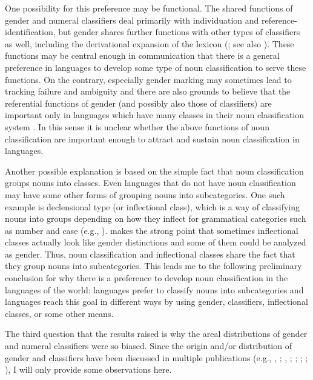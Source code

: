 \documentclass[output=collectionpaper]{langsci/langscibook}
\begin{document}
One possibility for this preference may be functional. The shared functions of gender and numeral classifiers deal primarily with individuation and reference-identification, but gender shares further functions with other types of classifiers as well, including the derivational expansion of the lexicon (\citealt{Contini-Morava2013}; see also \citealt[136--141]{Riddle2008}). These functions may be central enough in communication that there is a general preference in languages to develop some type of noun classification to serve these functions. On the contrary, especially gender marking may sometimes lead to tracking failure and ambiguity and there are also grounds to believe that the referential functions of gender (and possibly also those of classifiers) are important only in languages which have many classes in their noun classification system \citep[158--159]{Trudgill2011}. In this sense it is unclear whether the above functions of noun classification are important enough to attract and sustain noun classification in languages.

Another possible explanation is based on the simple fact that noun classification groups nouns into classes. Even languages that do not have noun classification may have some other forms of grouping nouns into subcategories. One such example is declensional type (or inflectional class), which is a way of classifying nouns into groups depending on how they inflect for grammatical categories such as number and case (e.g., \citealt[67--68]{Kramer2015}). \citet[583--584]{Dahl2000} makes the strong point that sometimes inflectional classes actually look like gender distinctions and some of them could be analyzed as gender. Thus, noun classification and inflectional classes share the fact that they group nouns into subcategories. This leads me to the following preliminary conclusion for why there is a preference to develop noun classification in the languages of the world: languages prefer to classify nouns into subcategories and languages reach this goal in different ways by using gender, classifiers, inflectional classes, or some other means.

The third question that the results raised is why the areal distributions of gender and numeral classifiers were so biased. Since the origin and/or distribution of gender and classifiers have been discussed in multiple publications (e.g., \citealt{Corbett1991}, \citealt{Corbett2013}; \citealt{Nichols1992}, \citealt{Nichols2003}; \citealt{Aikhenvald2000}; \citealt{Luraghi2011}; \citealt{Gil2013}; \citealt{Passer2016b}), I will only provide some observations here.
\end{document}
